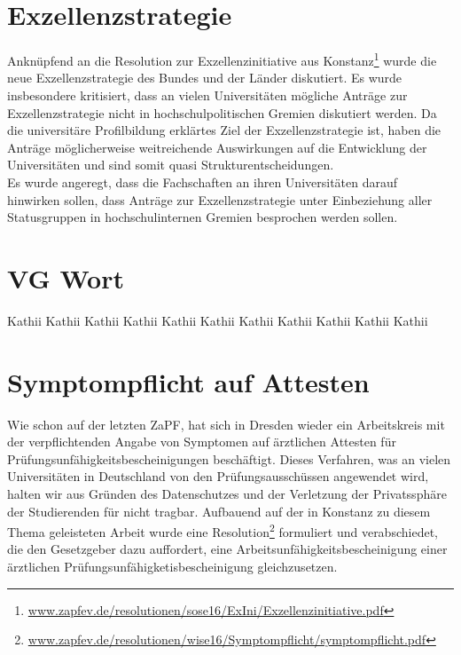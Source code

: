 \section*{Exzellenzstrategie}
Anknüpfend an die Resolution zur Exzellenzinitiative aus Konstanz\footnote{\href{https://zapfev.de/resolutionen/sose16/ExIni/Exzellenzinitiative.pdf}{\url{www.zapfev.de/resolutionen/sose16/ExIni/Exzellenzinitiative.pdf}}} 
wurde die neue Exzellenzstrategie des Bundes und der Länder diskutiert. Es wurde insbesondere kritisiert, dass an vielen Universitäten mögliche Anträge zur 
Exzellenzstrategie nicht in hochschulpolitischen Gremien diskutiert werden. Da die universitäre Profilbildung erklärtes Ziel der Exzellenzstrategie ist, 
haben die Anträge möglicherweise weitreichende Auswirkungen auf die Entwicklung der Universitäten und sind somit quasi Strukturentscheidungen.\\
Es wurde angeregt, dass die Fachschaften an ihren Universitäten darauf hinwirken sollen, dass Anträge zur Exzellenzstrategie unter Einbeziehung 
aller Statusgruppen in hochschulinternen Gremien besprochen werden sollen.

\section*{VG Wort}
Kathii Kathii Kathii Kathii Kathii Kathii Kathii Kathii Kathii Kathii Kathii 

\section*{Symptompflicht auf Attesten}
Wie schon auf der letzten ZaPF, hat sich in Dresden wieder ein Arbeitskreis mit der verpflichtenden Angabe von Symptomen auf ärztlichen Attesten für 
Prüfungsunfähigkeitsbescheinigungen beschäftigt. Dieses Verfahren, was an vielen Universitäten in Deutschland von den Prüfungsausschüssen angewendet wird, 
halten wir aus Gründen des Datenschutzes und der Verletzung der Privatssphäre der Studierenden für nicht tragbar. Aufbauend auf der in Konstanz zu diesem 
Thema geleisteten Arbeit wurde eine Resolution\footnote{\href{https://zapfev.de/resolutionen/wise16/Symptompflicht/symptompflicht.pdf}{\url{www.zapfev.de/resolutionen/wise16/Symptompflicht/symptompflicht.pdf}}} 
formuliert und verabschiedet, die den Gesetzgeber dazu auffordert, eine Arbeitsunfähigkeitsbescheinigung einer ärztlichen Prüfungsunfähigketisbescheinigung gleichzusetzen.

